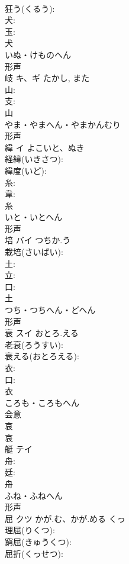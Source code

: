 \documentclass[8pt]{extreport}
\begin{document}
\begin{CJK}{UTF8}{min}
\\	狂う(くるう): 
\\	犬: 
\\	玉: 
\\	犬	
\\	いぬ・けものへん	
\\	形声 
\\	岐	キ、ギ		たかし, また	
\\	山: 
\\	支: 
\\	山	
\\	やま・やまへん・やまかんむり	
\\	形声 
\\	緯	イ	よこいと、ぬき		
\\	経緯(いきさつ): 
\\	緯度(いど): 
\\	糸: 
\\	韋: 
\\	糸	
\\	いと・いとへん	
\\	形声 
\\	培	バイ	つちか.う		
\\	栽培(さいばい): 
\\	土: 
\\	立: 
\\	口: 
\\	土	
\\	つち・つちへん・どへん	
\\	形声 
\\	衰	スイ	おとろ.える		
\\	老衰(ろうすい): 
\\	衰える(おとろえる): 
\\	衣: 
\\	口: 
\\	衣	
\\	ころも・ころもへん	
\\	会意 
\\	哀 
\\	哀 
\\	艇	テイ			
\\	舟: 
\\	廷: 
\\	舟	
\\	ふね・ふねへん	
\\	形声 
\\	屈	クツ	かが.む、かが.める	くっ	
\\	理屈(りくつ): 
\\	窮屈(きゅうくつ): 
\\	屈折(くっせつ): 

\end{CJK}
\end{document}
